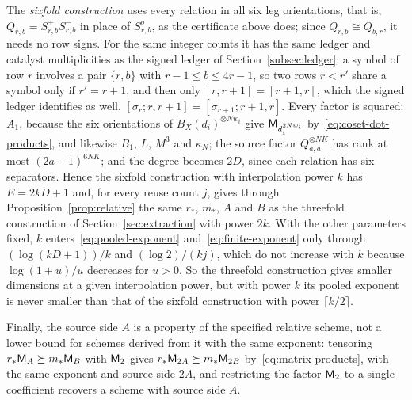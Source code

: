 The \emph{sixfold construction} uses every relation in all six leg
orientations, that is, \(Q_{r,b}=S^+_{r,b}S^-_{r,b}\) in place of
\(S^\sigma_{r,b}\), as the certificate above does; since
\(Q_{r,b}\cong Q_{b,r}\), it needs no row signs. For the same integer
counts it has the same ledger and catalyst multiplicities as the signed
ledger of Section~\ref{subsec:ledger}: a symbol of row \(r\) involves a
pair \(\{r,b\}\) with \(r-1\le b\le4r-1\), so two rows \(r<r'\) share a
symbol only if \(r'=r+1\), and then only \([r,r+1]=[r+1,r]\), which the
signed ledger identifies as well,
\([\sigma_r;r,r+1]=[\sigma_{r+1};r+1,r]\). Every factor is squared:
\(A_1\), because the six orientations of \(B_X(d_i)^{\otimes Nw_i}\) give
\(\mathsf M_{d_i^{2Nw_i}}\) by~\eqref{eq:coset-dot-products}, and likewise
\(B_1\), \(L\), \(M^3\) and \(\kappa_N\); the source factor
\(Q_{a,a}^{\otimes NK}\) has rank at most \((2a-1)^{6NK}\); and the degree
becomes \(2D\), since each relation has six separators. Hence the sixfold
construction with interpolation power \(k\) has \(E=2kD+1\) and, for every
reuse count \(j\), gives through Proposition~\ref{prop:relative} the same
\(r_*\), \(m_*\), \(A\) and \(B\) as the threefold construction of
Section~\ref{sec:extraction} with power \(2k\). With the other parameters
fixed, \(k\) enters~\eqref{eq:pooled-exponent}
and~\eqref{eq:finite-exponent} only through \((\log(kD+1))/k\) and
\((\log2)/(kj)\), which do not increase with \(k\) because
\(\log(1+u)/u\) decreases for \(u>0\). So the threefold construction
gives smaller dimensions at a given interpolation power, but with power
\(k\) its pooled exponent is never smaller than that of the sixfold
construction with power
\(\lceil k/2\rceil\).

Finally, the source side \(A\) is a property of the specified relative
scheme, not a lower bound for schemes derived from it with the same
exponent: tensoring \(r_*\mathsf M_A\succeq m_*\mathsf M_B\) with \(\mathsf M_2\) gives
\(r_*\mathsf M_{2A}\succeq m_*\mathsf M_{2B}\) by~\eqref{eq:matrix-products}, with the
same exponent and source side \(2A\), and restricting the factor \(\mathsf M_2\)
to a single coefficient recovers a scheme with source side \(A\).
